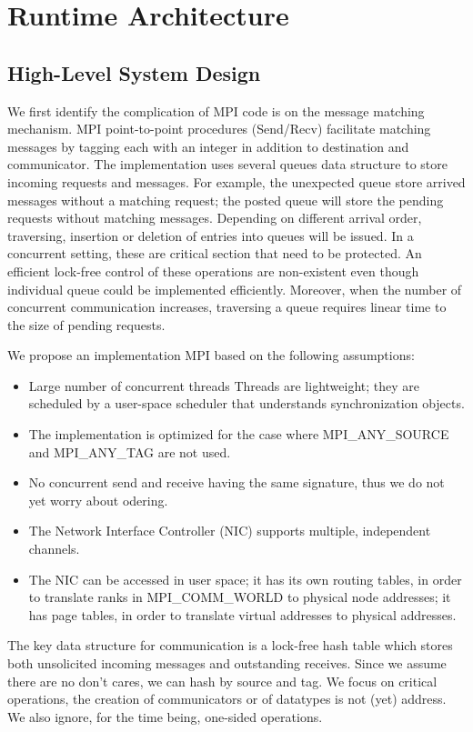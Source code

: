 \documentclass{sig-alternate-05-2015}
\begin{document}
\section{Runtime Architecture}
\subsection{High-Level System Design}
We first identify the complication of MPI code is on the message matching
mechanism. MPI point-to-point procedures (Send/Recv) facilitate matching
messages by tagging each with an integer in addition to destination and
communicator. The implementation uses several queues data structure to store
incoming requests and messages. For example, the unexpected queue store arrived
messages without a matching request; the posted queue will store the pending
requests without matching messages. Depending on different arrival order,
traversing, insertion or deletion of entries into queues will be issued. In a
concurrent setting, these are critical section that need to be protected. An
efficient lock-free control of these operations are non-existent even though
individual queue could be implemented efficiently.  Moreover, when the number
of concurrent communication increases, traversing a queue requires linear time
to the size of pending requests.

We propose an implementation MPI based on the following assumptions:
\begin{itemize}
  \item Large number of concurrent threads Threads are lightweight; they are
    scheduled by a user-space scheduler that understands synchronization
    objects.
  \item The implementation is optimized for the case where MPI_ANY_SOURCE and MPI_ANY_TAG are not used.
  \item No concurrent send and receive having the same signature, thus we do not yet worry about odering.
  \item The Network Interface Controller (NIC) supports multiple, independent channels.
  \item The NIC can be accessed in user space; it has its own routing tables,
    in order to translate ranks in MPI\_COMM\_WORLD to physical node addresses;
    it has page tables, in order to translate virtual addresses to physical
    addresses.
\end{itemize}

The key data structure for communication is a lock-free hash table which stores
both unsolicited incoming messages and outstanding receives. Since we assume
there are no don't cares, we can hash by source and tag. We focus on critical
operations, the creation of communicators or of datatypes is not (yet)
address. We also ignore, for the time being, one-sided operations.
\end{document}
